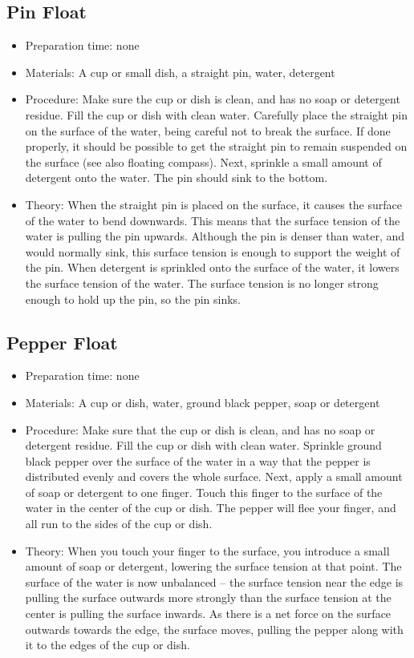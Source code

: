 \subsection{Pin Float}
\begin{itemize}
\item{Preparation time: none}
\item{Materials: A cup or small dish, a straight pin, water, detergent}
\item{Procedure: Make sure the cup or dish is clean, and has no soap or detergent residue. Fill the cup or dish with clean water. Carefully place the straight pin on the surface of the water, being careful not to break the surface. If done properly, it should be possible to get the straight pin to remain suspended on the surface (see also floating compass). Next, sprinkle a small amount of detergent onto the water. The pin should sink to the bottom.}
\item{Theory: When the straight pin is placed on the surface, it causes the surface of the water to bend downwards. This means that the surface tension of the water is pulling the pin upwards. Although the pin is denser than water, and would normally sink, this surface tension is enough to support the weight of the pin. When detergent is sprinkled onto the surface of the water, it lowers the surface tension of the water. The surface tension is no longer strong enough to hold up the pin, so the pin sinks.}
\end{itemize}

\subsection{Pepper Float}
\begin{itemize}
\item{Preparation time: none}
\item{Materials: A cup or dish, water, ground black pepper, soap or detergent}
\item{Procedure: Make sure that the cup or dish is clean, and has no soap or detergent residue. Fill the cup or dish with clean water. Sprinkle ground black pepper over the surface of the water in a way that the pepper is distributed evenly and covers the whole surface. Next, apply a small amount of soap or detergent to one finger. Touch this finger to the surface of the water in the center of the cup or dish. The pepper will flee your finger, and all run to the sides of the cup or dish.}
\item{Theory: When you touch your finger to the surface, you introduce a small amount of soap or detergent, lowering the surface tension at that point. The surface of the water is now unbalanced – the surface tension near the edge is pulling the surface outwards more strongly than the surface tension at the center is pulling the surface inwards. As there is a net force on the surface outwards towards the edge, the surface moves, pulling the pepper along with it to the edges of the cup or dish.}
\end{itemize}

